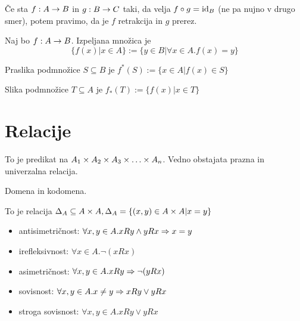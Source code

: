 
Če sta $f: A \to B$ in $g: B \to C$ taki, da velja $f \circ g = \mathrm{id}_B$ (ne pa nujno v drugo smer), potem pravimo, da je $f$ retrakcija in $g$ prerez.


Naj bo $f: A \to B$. Izpeljana množica je \[\{f(x) | x\in A\} := \{y \in B | \forall x \in A. f(x)=y\}\]


Praslika podmnožice $S \subseteq B$ je \(f^*(S) := \{x \in A | f(x) \in S\}\)

Slika podmnožice \(T \subseteq A\) je \(f_*(T) := \{f(x) | x \in T\}\)

\section{Relacije}


To je predikat na $A_1 \times A_2 \times A_3 \times \ldots \times A_n$. Vedno obstajata prazna in univerzalna relacija.


Domena in kodomena.


To je relacija $\Delta_A \subseteq A \times A, \Delta_A = \{(x,y) \in A \times A | x=y\}$


\begin{itemize}
	\item antisimetričnost: $\forall x, y \in A. x R y \land y R x \Rightarrow x=y$
	\item irefleksivnost: $\forall x \in A.\lnot (x R x)$
	\item asimetričnost: $\forall x, y \in A. xRy \Rightarrow \lnot (yRx)$
	\item sovisnost: $\forall x, y \in A. x \neq y \Rightarrow x R y \lor y R x$
	\item stroga sovisnost: $\forall x, y \in A. x R y \lor y R x$
\end{itemize}


